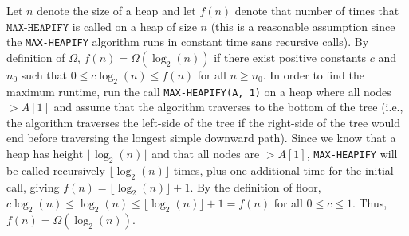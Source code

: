Let $n$ denote the size of a heap and let $f(n)$ denote that number of times that $\texttt{MAX-HEAPIFY}$ is called on a heap of size $n$ (this is a reasonable assumption since the \texttt{MAX-HEAPIFY} algorithm runs in constant time sans recursive calls). By definition of $\Omega$, $f(n) = \Omega(\log_2(n))$ if there exist positive constants $c$ and $n_0$ such that $0 \leq c \log_2(n) \leq f(n)$ for all $n \geq n_0$. In order to find the maximum runtime, run the call \texttt{MAX-HEAPIFY(A, 1)} on a heap where all nodes $> A[1]$ and assume that the algorithm traverses to the bottom of the tree (i.e., the algorithm traverses the left-side of the tree if the right-side of the tree would end before traversing the longest simple downward path). Since we know that a heap has height $\lfloor \log_2(n) \rfloor$ and that all nodes are $> A[1]$, \texttt{MAX-HEAPIFY} will be called recursively $\lfloor \log_2(n) \rfloor$ times, plus one additional time for the initial call, giving $f(n) = \lfloor \log_2(n) \rfloor + 1$. By the definition of floor, $c \log_2(n) \leq \log_2(n) \leq \lfloor \log_2(n) \rfloor + 1 = f(n)$ for all $0 \leq c \leq 1$. Thus, $f(n) = \Omega(\log_2(n))$.
